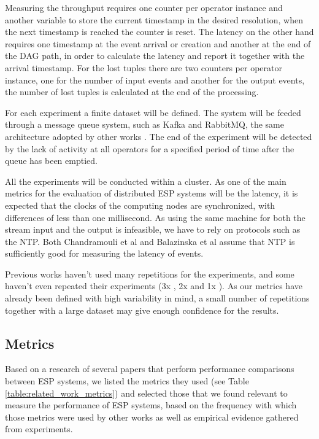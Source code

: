 \documentclass[ppgc,diss,english]{iiufrgs}
\begin{document}
Measuring the throughput requires one counter per operator instance and another variable to store the current timestamp in the desired resolution, when the next timestamp is reached the counter is reset. The latency on the other hand requires one timestamp at the event arrival or creation and another at the end of the DAG path, in order to calculate the latency and report it together with the arrival timestamp. For the lost tuples there are two counters per operator instance, one for the number of input events and another for the output events, the number of lost tuples is calculated at the end of the processing.


For each experiment a finite dataset will be defined. The system will be feeded through a message queue system, such as Kafka and RabbitMQ, the same architecture adopted by other works \cite{chardonnens2013big, lim2013execution, wang2013cluster, sawant2013big}. The end of the experiment will be detected by the lack of activity at all operators for a specified period of time after the queue has been emptied.

All the experiments will be conducted within a cluster. As one of the main metrics for the evaluation of distributed ESP systems will be the latency, it is expected that the clocks of the computing nodes are synchronized, with differences of less than one millisecond. As using the same machine for both the stream input and the output is infeasible, we have to rely on protocols such as the NTP. Both Chandramouli et al \cite{chandramouli2011accurate} and Balazinska et al \cite{balazinska2008fault} assume that NTP is sufficiently good for measuring the latency of events.

Previous works haven't used many repetitions for the experiments, and some haven't even repeated their experiments (3x \cite{dayarathna2013performance}, 2x \cite{mendes2009performance} and 1x \cite{de2011watershed}). As our metrics have already been defined with high variability in mind, a small number of repetitions together with a large dataset may give enough confidence for the results.

\subsection{Metrics}

Based on a research of several papers that perform performance comparisons between ESP systems, we listed the metrics they used (see Table \ref{table:related_work_metrics}) and selected those that we found relevant to measure the performance of ESP systems, based on the frequency with which those metrics were used by other works as well as empirical evidence gathered from experiments.
\end{document}
